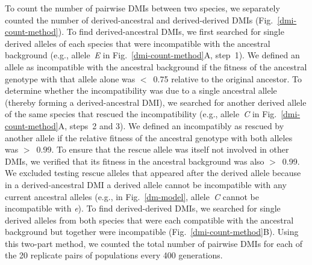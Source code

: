 \begin{doublespace}
To count the number of pairwise DMIs between two species,
we separately counted the number of derived-ancestral
and derived-derived DMIs (Fig.~\ref{dmi-count-method}).
%
To find derived-ancestral DMIs, we first searched
for single derived alleles of each species
that were incompatible with the ancestral background
(e.g., allele~\emph{E} in Fig.~\ref{dmi-count-method}A, step~1).
%
We defined an allele as incompatible with the ancestral background
if the fitness of the ancestral genotype with that allele alone
was $<$~0.75 relative to the original ancestor.
%
To determine whether the incompatibility was due to a single ancestral allele
(thereby forming a derived-ancestral DMI), we searched for another
derived allele of the same species that rescued the incompatibility
(e.g., allele~\emph{C} in Fig.~\ref{dmi-count-method}A, steps~2 and 3).
%
We defined an incompatibly as rescued by another allele if the relative fitness
of the ancestral genotype with both alleles was $>$~0.99.
%
To ensure that the rescue allele was itself not involved in other DMIs,
we verified that its fitness in the ancestral background was also $>$~0.99.
%
We excluded testing rescue alleles that appeared after the derived allele
because in a derived-ancestral DMI a derived allele cannot be incompatible
with any current ancestral alleles (e.g., in Fig.~\ref{dm-model},
allele~\emph{C} cannot be incompatible with \emph{e}).
%
To find derived-derived DMIs, we searched for single derived alleles
from both species that were each compatible with the ancestral background
but together were incompatible (Fig.~\ref{dmi-count-method}B).
%
Using this two-part method, we counted the total number of pairwise DMIs
for each of the 20 replicate pairs of populations every 400 generations.




\end{doublespace}

